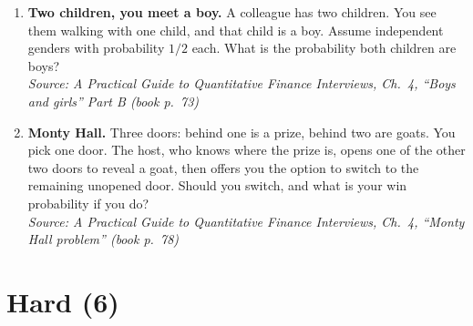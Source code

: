 \documentclass[11pt]{article}
\begin{document}
\begin{enumerate}[label=\textbf{\arabic*.}, resume]
\item \textbf{Two children, you meet a boy.}
A colleague has two children. You see them walking with one child, and that child is a boy.
Assume independent genders with probability $1/2$ each. What is the probability both children are boys?\\
\hfill{\small\textit{Source: A Practical Guide to Quantitative Finance Interviews, Ch.\ 4, ``Boys and girls'' Part B (book p.\ 73)}}

\item \textbf{Monty Hall.}
Three doors: behind one is a prize, behind two are goats.
You pick one door. The host, who knows where the prize is, opens one of the other two doors to reveal a goat, then offers you the option to switch to the remaining unopened door.
Should you switch, and what is your win probability if you do?\\
\hfill{\small\textit{Source: A Practical Guide to Quantitative Finance Interviews, Ch.\ 4, ``Monty Hall problem'' (book p.\ 78)}}

\end{enumerate}

\section*{Hard (6)}
\end{document}
